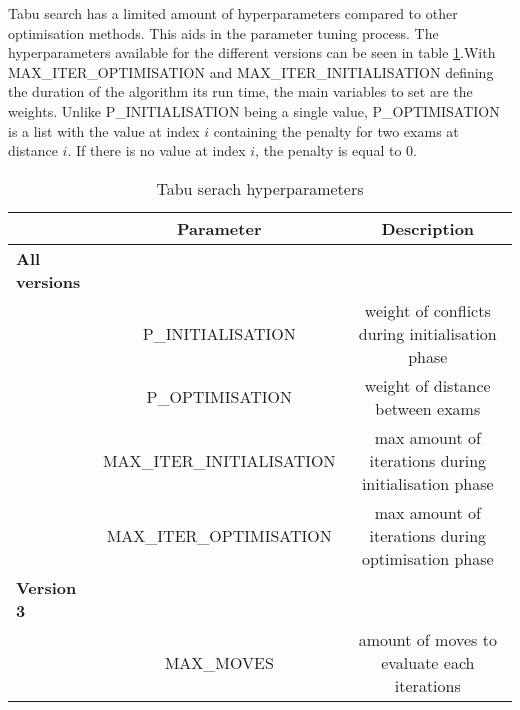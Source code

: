 Tabu search has a limited amount of hyperparameters compared to other optimisation methods. This aids in the parameter tuning process. The hyperparameters  available for the different versions can be seen in table \ref{tab:possible_parameters}.With MAX\_ITER\_OPTIMISATION and MAX\_ITER\_INITIALISATION defining the duration of the algorithm its run time, the main variables to set are the weights. Unlike P\_INITIALISATION being a single value, P\_OPTIMISATION is a list with the value at index $i$ containing the penalty for two exams at distance $i$. If there is no value at index $i$, the penalty is equal to 0.

\begin{table}[h]
	\caption{Tabu serach hyperparameters}
	\label{tab:possible_parameters}
	\centering
	\begin{tabular}{l c c}
		\hline
		& \textbf{Parameter} & \textbf{Description}  \\ \hline
        \textbf{All versions} & &\\ 
    
		& P\_INITIALISATION & weight of conflicts during initialisation phase \\
        & P\_OPTIMISATION  & weight of distance between exams\\
	    & MAX\_ITER\_INITIALISATION & max amount of iterations during initialisation phase \\
        & MAX\_ITER\_OPTIMISATION & max amount of iterations during optimisation phase\\ 
        \textbf{Version 3} & &\\ 
        & MAX\_MOVES & amount of moves to evaluate each iterations \\ 
        \hline
	\end{tabular}
\end{table}